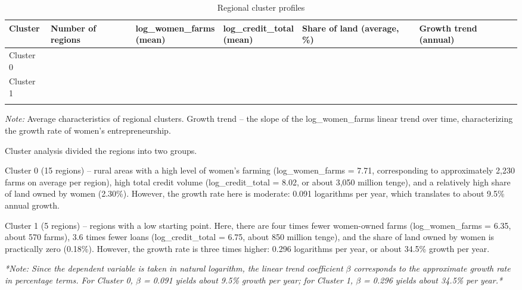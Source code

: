 ﻿\documentclass[pdflatex,sn-mathphys-ay]{sn-jnl}
\begin{document}
\begin{table}[htbp]
\caption{Regional cluster profiles}\label{tab:cluster-profiles}
\scriptsize
\renewcommand{\arraystretch}{1.1}
\setlength{\tabcolsep}{3pt}
\begin{tabularx}{\textwidth}{>{\raggedright\arraybackslash}p{}>{\centering\arraybackslash}p{}>{\raggedright\arraybackslash}X>{\raggedright\arraybackslash}X>{\raggedright\arraybackslash}X>{\centering\arraybackslash}p{}}
\toprule
Cluster & Number of regions & \shortstack[l]{log\_women\_farms\\(mean)} & \shortstack[l]{log\_credit\_total\\(mean)} & Share of land (average, \%) & Growth trend (annual)\\
\midrule
Cluster 0 & 15 & 7.71 & 8.02 & 2.30 & 0.091\\
Cluster 1 & 5 & 6.35 & 6.75 & 0.18 & 0.296\\
\botrule
\end{tabularx}
\setlength{\tabcolsep}{6pt}
\renewcommand{\arraystretch}{1}
\end{table}

\emph{Note:} Average characteristics of regional clusters. Growth trend -- the
slope of the log\_women\_farms linear trend over time, characterizing
the growth rate of women's entrepreneurship.

Cluster analysis divided the regions into two groups.

Cluster 0 (15 regions) -- rural areas with a high level of women's
farming (log\_women\_farms = 7.71, corresponding to approximately 2,230
farms on average per region), high total credit volume
(log\_credit\_total = 8.02, or about 3,050 million tenge), and a
relatively high share of land owned by women (2.30\%). However, the
growth rate here is moderate: 0.091 logarithms per year, which
translates to about 9.5\% annual growth.

Cluster 1 (5 regions) -- regions with a low starting point. Here, there
are four times fewer women-owned farms (log\_women\_farms = 6.35, about
570 farms), 3.6 times fewer loans (log\_credit\_total = 6.75, about 850
million tenge), and the share of land owned by women is practically zero
(0.18\%). However, the growth rate is three times higher: 0.296
logarithms per year, or about 34.5\% growth per year.

\emph{*Note: Since the dependent variable is taken in natural logarithm,
the linear trend coefficient $\beta$ corresponds to the approximate growth
rate in percentage terms. For Cluster 0, $\beta$ = 0.091 yields about 9.5\%
growth per year; for Cluster 1, $\beta$ = 0.296 yields about 34.5\% per
year.*}
\end{document}
